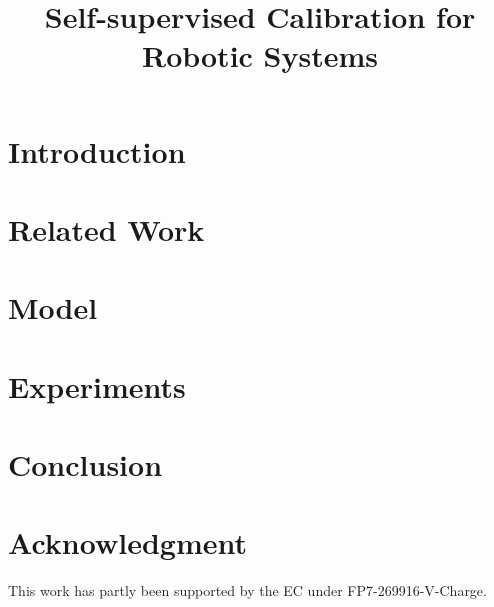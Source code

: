 \documentclass[letterpaper, 10 pt, conference]{sty/ieeeconf}
\begin{document}
\title{\LARGE \bf
Self-supervised Calibration for Robotic Systems
}

\author{
}

\maketitle

\begin{abstract}
\end{abstract}

\section{Introduction\label{intro}}


\section{Related Work\label{sec:rel}}


\section{Model\label{sec:model}}


\section{Experiments\label{sec:exp}}


\section{Conclusion\label{sec:conc}}


\section*{Acknowledgment}
This work has partly been supported by the EC under FP7-269916-V-Charge.



\end{document}
